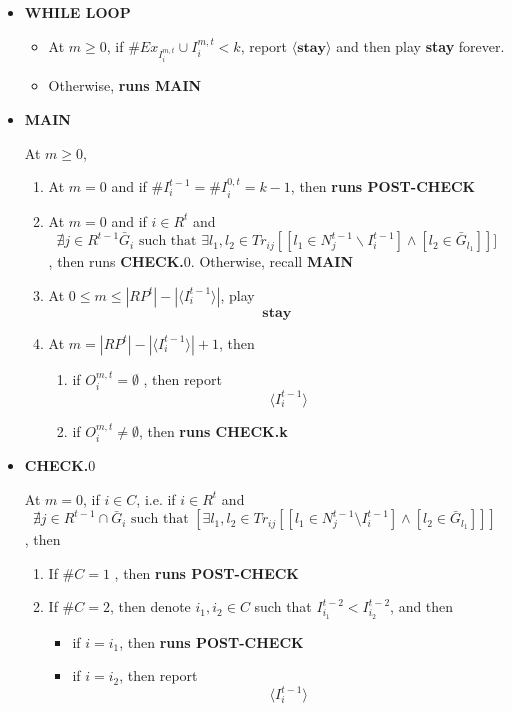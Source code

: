 \documentclass[12pt]{article}
\theoremstyle{remark}
\theoremstyle{remark}
\begin{document}
\begin{itemize}

\item \textbf{WHILE LOOP}
\begin{itemize}
\item At $m\geq 0$, if $\# Ex_{I^{m,t}_i}\cup I^{m,t}_i< k$, report $\langle \textbf{stay} \rangle$ and then play \textbf{stay} forever.
\item Otherwise, \textbf{runs MAIN }
\end{itemize}


\item \textbf{MAIN}

At $m\geq 0$, 

\begin{enumerate}
\item At $m=0$ and if $\# I^{t-1}_i=\# I^{0,t}_i= k-1$, then 
\textbf{runs POST-CHECK }


\item At $m=0$ and if $i\in R^t$ and
\[\nexists j\in R^{t-1}\bar{G}_i \text{ such that }\exists l_1,l_2\in Tr_{ij}[[l_1\in N^{t-1}_j\backslash I^{t-1}_i] \wedge [l_2\in \bar{G}_{l_1}]]]\]
, then runs \textbf{CHECK.$0$}. Otherwise, recall \textbf{MAIN}
\item At $0\leq m \leq |RP^t|-|\langle I^{t-1}_i \rangle|$, play
\[\textbf{stay}\]
\item At $m = |RP^t|-|\langle I^{t-1}_i \rangle|+1$, then
\begin{enumerate}
\item if $O^{m,t}_i= \emptyset$ 
, then report
\[\langle I^{t-1}_i \rangle\]
\item if $O^{m,t}_i\neq \emptyset$, then \textbf{runs CHECK.k}

\end{enumerate}

\end{enumerate}





\item \textbf{CHECK.$0$}

At $m=0$, if $i\in C$, i.e. if $i\in R^t$ and
\[\nexists j\in R^{t-1}\cap \bar{G}_i \text{ such that }[\exists l_1,l_2\in Tr_{ij}[[l_1\in N^{t-1}_j\setminus I^{t-1}_i] \wedge [l_2\in \bar{G}_{l_1}]]]\]
, then
\begin{enumerate}
\item If $\#C=1$
, then 
\textbf{runs POST-CHECK }

\item If $\#C=2$, then denote $i_1,i_2\in C$ such that $I^{t-2}_{i_1}<I^{t-2}_{i_2}$, and then
\begin{itemize}
\item if $i=i_1$, then 
\textbf{runs POST-CHECK }
\item if $i=i_2$, then report
\[\langle I^{t-1}_i \rangle\]


\end{itemize}
\end{enumerate}
\end{itemize}
\end{document}
